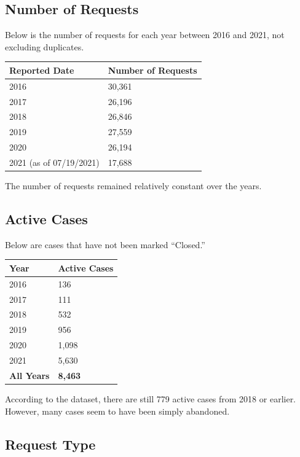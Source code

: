 \documentclass[
]{book}
\begin{document}
\hypertarget{number-of-requests}{%
\subsection{Number of Requests}\label{number-of-requests}}

Below is the number of requests for each year between 2016 and 2021, not excluding duplicates.

\begin{longtable}[]{@{}ll@{}}
\toprule
Reported Date & Number of Requests \\
\midrule
\endhead
2016 & 30,361 \\
2017 & 26,196 \\
2018 & 26,846 \\
2019 & 27,559 \\
2020 & 26,194 \\
2021 (as of 07/19/2021) & 17,688 \\
\bottomrule
\end{longtable}

The number of requests remained relatively constant over the years.

\hypertarget{active-cases}{%
\subsection{Active Cases}\label{active-cases}}

Below are cases that have not been marked ``Closed.''

\begin{longtable}[]{@{}ll@{}}
\toprule
Year & Active Cases \\
\midrule
\endhead
2016 & 136 \\
2017 & 111 \\
2018 & 532 \\
2019 & 956 \\
2020 & 1,098 \\
2021 & 5,630 \\
\textbf{All Years} & \textbf{8,463} \\
\bottomrule
\end{longtable}

According to the dataset, there are still 779 active cases from 2018 or earlier. However, many cases seem to have been simply abandoned.

\hypertarget{request-type}{%
\subsection{Request Type}\label{request-type}}
\end{document}
